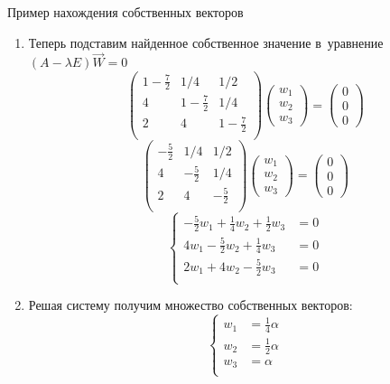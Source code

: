 \documentclass[unicode,11pt,notheorems,xcolor=table]{beamer}
\begin{document}
\begin{frame}[allowframebreaks]{Пример нахождения собственных векторов}
\begin{enumerate}
    \framebreak
    \item Теперь подставим найденное собственное значение в~уравнение $(A-\lambda E)\overrightarrow{W} = 0$
    $$
    \begin{pmatrix}
        1-\frac{7}{2}& 1/4 & 1/2 \\
        4 & 1-\frac{7}{2} & 1/4 \\
        2 & 4  & 1-\frac{7}{2}\\
    \end{pmatrix} 
    \begin{pmatrix}
        w_1 \\ w_2 \\ w_3
    \end{pmatrix} 
    = 
    \begin{pmatrix}
        0 \\ 0 \\ 0
    \end{pmatrix}     
    $$
    $$
    \begin{pmatrix}
        -\frac{5}{2}& 1/4 & 1/2 \\
        4 & -\frac{5}{2} & 1/4 \\
        2 & 4  & -\frac{5}{2}\\
    \end{pmatrix} 
    \begin{pmatrix}
        w_1 \\ w_2 \\ w_3
    \end{pmatrix} 
    = 
    \begin{pmatrix}
        0 \\ 0 \\ 0
    \end{pmatrix}     
    $$    
    \alert{$$
    \left\lbrace
    \begin{aligned}
        -\frac{5}{2}w_1+ \frac{1}{4}w_2 + \frac{1}{2}w_3 &= 0 \\
        4w_1 -\frac{5}{2}w_2 +  \frac{1}{4}w_3 &= 0 \\
        2w_1 + 4w_2 -\frac{5}{2}w_3 &= 0\\
    \end{aligned}
    \right.
    $$}
    \framebreak 
    \item Решая систему получим множество собственных векторов:
    $$
    \left\lbrace
    \begin{aligned}
        w_1 &= \frac{1}{4}\alpha\\
        w_2 &= \frac{1}{2}\alpha\\
        w_3 &= \alpha\\

\end{aligned}$$
\end{enumerate}
\end{frame}
\end{document}

